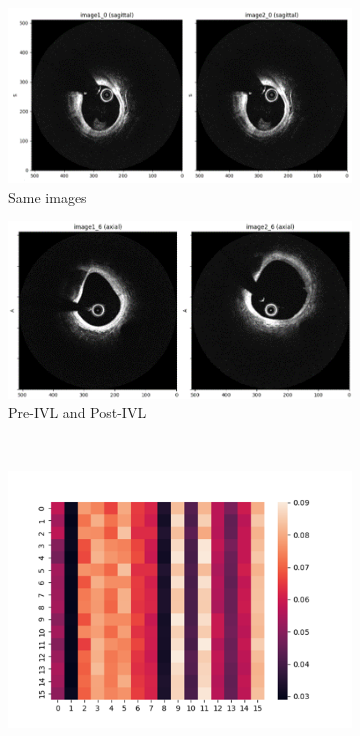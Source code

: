 \documentclass[a4paper,11pt,oneside]{report}
\begin{document}
\begin{figure}[hbt]
    \centering
    \begin{subfigure}[t]{0.3\textwidth}
        \centering
        \includegraphics[width=0.9\linewidth]{figures/discussion_clip_same_image.png}
        \caption{Same images}
        \label{fig:clip-sanity-check-same-image}
    \end{subfigure}%
    \begin{subfigure}[t]{0.3\textwidth}
        \centering
        \includegraphics[width=0.9\linewidth]{figures/discussion_clip_pre-ivl_post-ivl_image.png}
        \caption{Pre-IVL and Post-IVL}
        \label{fig:clip-sanity-check-different-image}
    \end{subfigure}\\
    \begin{subfigure}[t]{0.3\textwidth}
        \centering
        \includegraphics[width=0.9\linewidth]{figures/discussion_clip_same_image_diff_enc_diff_proj_logits.png}

\end{subfigure}
\end{figure}
\end{document}
